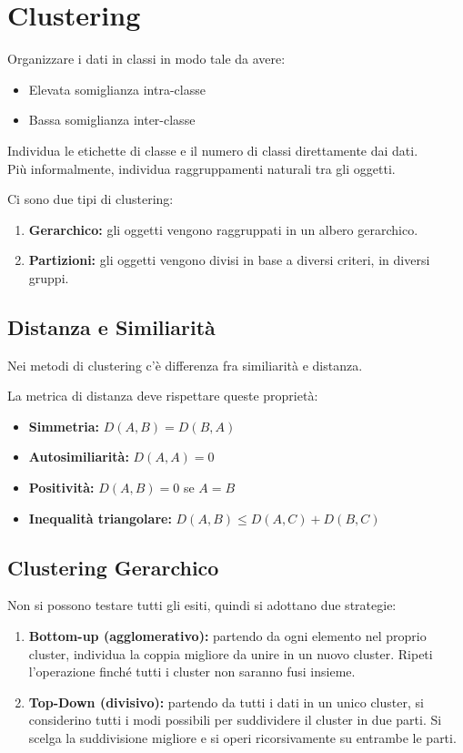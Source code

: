 \chapter{Clustering}

\begin{defn}[Clustering]
  Organizzare i dati in classi in modo tale da avere:
  \begin{itemize}
    \item Elevata somiglianza intra-classe
    \item Bassa somiglianza inter-classe
  \end{itemize}
  Individua le etichette di classe e il numero di classi direttamente dai dati. \\ 
  Più informalmente, individua raggruppamenti naturali tra gli oggetti.
\end{defn}

Ci sono due tipi di clustering:
\begin{enumerate}
  \item \textbf{Gerarchico:} gli oggetti vengono raggruppati in un albero gerarchico.
  \item \textbf{Partizioni:} gli oggetti vengono divisi in base a diversi criteri, in diversi gruppi.
\end{enumerate}

\section{Distanza e Similiarità}
Nei metodi di clustering c'è differenza fra similiarità e distanza.

\begin{defn}[Distanza]
  La metrica di distanza deve rispettare queste proprietà:
  \begin{itemize}
    \item \textbf{Simmetria:} $D(A, B) = D(B, A)$
    \item \textbf{Autosimiliarità:} $D(A, A) = 0$
    \item \textbf{Positività:} $D(A, B) = 0$ se $A = B$
    \item \textbf{Inequalità triangolare:} $D(A, B) \le D(A, C) + D(B, C)$
  \end{itemize}
\end{defn}

\section{Clustering Gerarchico}
Non si possono testare tutti gli esiti, quindi si adottano due strategie:
\begin{enumerate}
  \item \textbf{Bottom-up (agglomerativo):} partendo da ogni elemento nel proprio cluster, individua la coppia migliore da unire in un nuovo cluster. 
    Ripeti l'operazione finché tutti i cluster non saranno fusi insieme.
  \item \textbf{Top-Down (divisivo):} partendo da tutti i dati in un unico cluster, si considerino tutti i modi possibili per suddividere il cluster in due parti. 
    Si scelga la suddivisione migliore e si operi ricorsivamente su entrambe le parti.
\end{enumerate}

